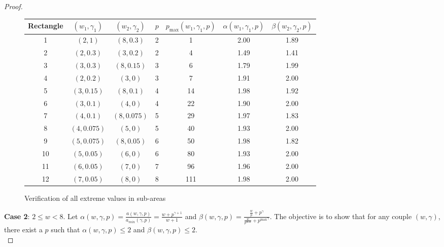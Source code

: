 \documentclass{article}
\begin{document}
\begin{proof}
\begin{figure}
\center
\begin{tabular}{|c|c|c|c|c|c|c|}
\hline
Rectangle & $(w_1,\gamma_1)$ & $(w_2,\gamma_2)$ & $p$ & $p_{\max}(w_1,\gamma_1,p) $& $\alpha(w_1,\gamma_1,p)$ & $\beta(w_2,\gamma_2,p)$ \\
\hline
1 & $(2,1)$ & $(8,0.3)$ & 2 &1 & 2.00 & 1.89 \\
2 & $(2,0.3)$ & $(3,0.2)$ & 2 &4 & 1.49 & 1.41 \\
3 & $(3,0.3)$ & $(8,0.15)$ & 3 &6 & 1.79 & 1.99 \\
4 & $(2,0.2)$ & $(3,0)$ & 3 &7 & 1.91 & 2.00 \\
5 & $(3,0.15)$ & $(8,0.1)$ & 4 &14 & 1.98 & 1.92 \\
6 & $(3,0.1)$ & $(4,0)$ & 4 &22 & 1.90 & 2.00 \\
7 & $(4,0.1)$ & $(8,0.075)$ & 5 &29 & 1.97 & 1.83 \\
8 & $(4,0.075)$ & $(5,0)$ & 5 &40 & 1.93 & 2.00 \\
9 & $(5,0.075)$ & $(8,0.05)$ & 6 &50 & 1.98 & 1.82 \\
10 & $(5,0.05)$ & $(6,0)$ & 6 &80 & 1.93 & 2.00 \\
11 & $(6,0.05)$ & $(7,0)$ & 7 &96 & 1.96 & 2.00 \\
12 & $(7,0.05)$ & $(8,0)$ & 8 &111 & 1.98 & 2.00 \\
\hline
\end{tabular}
\label{fig.verif}
\caption{Verification of all extreme values in sub-areas}
\end{figure}



\textbf{Case 2}: $2 \leq w<8$. 
Let  $\alpha(w,\gamma,p)= \frac{a(w,\gamma,p)}{a_{min}(\gamma,p)}=\frac{w+p^{\gamma+1}}{w+1}$ and $\beta(w,\gamma,p)= \frac{\frac{w}{p}+p^\gamma}{\frac{w}{p^{\max}}+{p^{\max}}^\gamma}$. The objective is to show that for any couple $(w,\gamma)$, there exist a $p$ such that $\alpha(w,\gamma,p)\leq 2$ and $\beta(w,\gamma,p)\leq 2$.\\


\end{proof}
\end{document}
